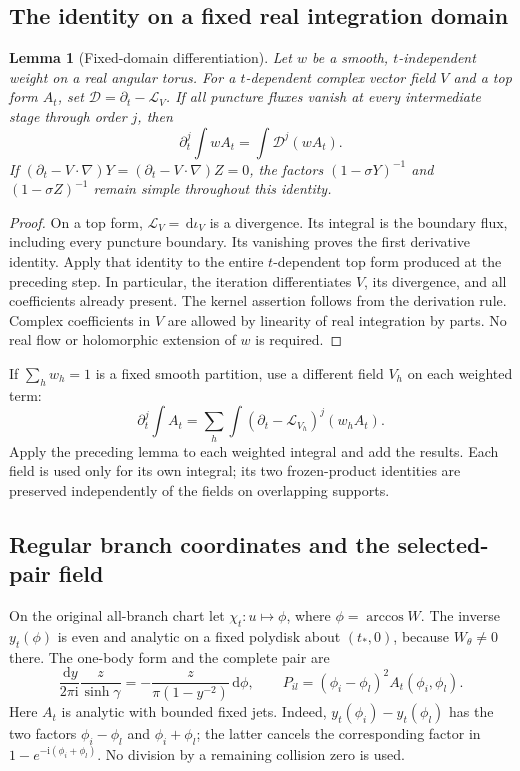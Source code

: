 \documentclass[11pt]{article}
\numberwithin{equation}{section}
\newtheorem{lemma}[theorem]{Lemma}
\theoremstyle{definition}
\newcommand{\dd}{\,\mathrm d}
\newcommand{\ii}{\mathrm i}
\newcommand{\Li}{\mathcal L}
\begin{document}
\subsection{The identity on a fixed real integration domain}
\begin{lemma}[Fixed-domain differentiation]\label{lem:lie}
Let \(w\) be a smooth, \(t\)-independent weight on a real angular torus.
For a \(t\)-dependent complex vector field \(V\) and a top form \(A_t\),
set \(\mathcal D=\partial_t-\Li_V\). If all puncture fluxes vanish
at every intermediate stage through order \(j\), then
\[
 \partial_t^j\int wA_t=\int\mathcal D^j(wA_t).
\]
If \((\partial_t-V\cdot\nabla)Y
=(\partial_t-V\cdot\nabla)Z=0\), the factors
\((1-\sigma Y)^{-1}\) and \((1-\sigma Z)^{-1}\) remain simple throughout this identity.
\end{lemma}
\begin{proof}
On a top form, \(\Li_V=\dd\iota_V\) is a divergence. Its integral is the
boundary flux, including every puncture boundary. Its vanishing proves
the first derivative identity. Apply that identity to the entire
\(t\)-dependent top form produced at the preceding step. In particular,
the iteration differentiates \(V\), its divergence, and all coefficients
already present. The kernel assertion follows from the derivation rule.
Complex coefficients in \(V\) are allowed by linearity of real
integration by parts. No real flow or holomorphic extension of \(w\)
is required.
\end{proof}

If \(\sum_h w_h=1\) is a fixed smooth partition, use a different field
\(V_h\) on each weighted term:
\begin{equation}
 \partial_t^j\int A_t
   =\sum_h\int(\partial_t-\Li_{V_h})^j(w_hA_t).
 \label{eq:chartwiseLie}
\end{equation}
Apply the preceding lemma to each weighted integral and add the
results. Each field is used only for its own integral; its two
frozen-product identities are preserved independently of the fields
on overlapping supports.

\subsection{Regular branch coordinates and the selected-pair field}
On the original all-branch chart let \(\chi_t:u\mapsto\phi\), where
\(\phi=\arccos W\). The inverse \(y_t(\phi)\) is even and analytic
on a fixed polydisk about \((t_*,0)\), because \(W_\theta\ne0\) there.
The one-body form and the complete pair are
\begin{equation}
 \frac{\dd y}{2\pi\ii}\frac{z}{\sinh\gamma}
   =-\frac{z}{\pi(1-y^{-2})}\dd\phi,\qquad
 P_{il}=(\phi_i-\phi_l)^2 A_t(\phi_i,\phi_l).
 \label{eq:branchregular}
\end{equation}
Here \(A_t\) is analytic with bounded fixed jets. Indeed,
\(y_t(\phi_i)-y_t(\phi_l)\) has the two factors
\(\phi_i-\phi_l\) and \(\phi_i+\phi_l\); the latter cancels the
corresponding factor in \(1-e^{-\ii(\phi_i+\phi_l)}\).
No division by a remaining collision zero is used.
\end{document}

